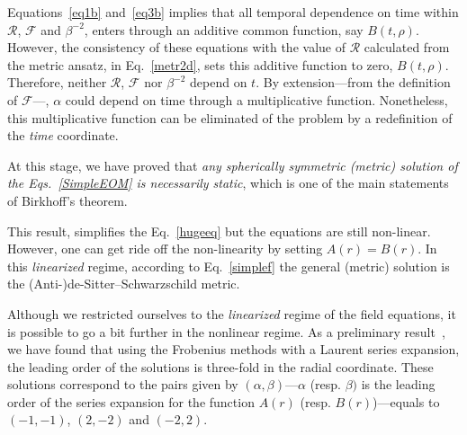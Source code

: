 Equations~\eqref{eq1b} and~\eqref{eq3b} implies that all temporal dependence on time within $\mathcal{R}$, $\mathcal{F}$ and $\beta^{-2}$, enters through an additive common function, say $B(t,\rho)$. However, the consistency of these equations with the value of $\mathcal{R}$ calculated from the metric ansatz, in Eq.~\eqref{metr2d}, sets this additive function to zero, $B(t,\rho)$. Therefore, neither $\mathcal{R}$, $\mathcal{F}$ nor $\beta^{-2}$ depend on $t$. By extension---from the definition of $\mathcal{F}$---, $\alpha$ could depend on time through a multiplicative function. Nonetheless, this multiplicative function can be eliminated of the problem by a redefinition of the \emph{time} coordinate.

At this stage, we have proved that \emph{any spherically symmetric (metric) solution of the Eqs.~\eqref{SimpleEOM} is necessarily static}, which is one of the main statements of Birkhoff's theorem.

This result, simplifies the Eq.~\eqref{hugeeq} but the equations are still non-linear. However, one can get ride off the non-linearity by setting $A(r) = B(r)$. In this \emph{linearized} regime, according to Eq.~\eqref{simplef} the general (metric) solution is the (Anti-)de-Sitter--Schwarzschild metric.

Although we restricted ourselves to the \emph{linearized} regime of the field equations, it is possible to go a bit further in the nonlinear regime. As a preliminary result~\cite{OCF-future2}, we have found that using the Frobenius methods with a Laurent series expansion, the leading order of the solutions is three-fold in the radial coordinate. These solutions correspond to the pairs given by $(\alpha,\beta)$---$\alpha$ (resp. $\beta)$ is the leading order of the series expansion for the function $A(r)$ (resp. $B(r)$)---equals to $(-1,-1)$, $(2,-2)$ and $(-2,2)$.
